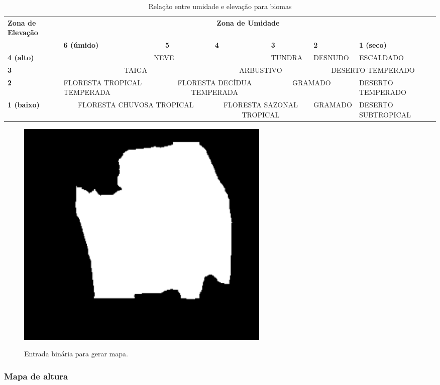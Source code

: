 \begin{table}
	\centering
	\caption{Relação entre umidade e elevação para biomas}
	\label{tab:biomes}
	\begin{tabularx}{\textwidth}{|X|X|X|X|X|X|X|}
	\hline
	\textbf{Zona de Elevação} & \multicolumn{6}{c|}{\textbf{Zona de Umidade}} \\
	\cline{2-7}
	 & \textbf{6 (úmido)} & \textbf{5} & \textbf{4} & \textbf{3} & \textbf{2} & \textbf{1 (seco)} \\
	\hline
	\textbf{4 (alto)} & \multicolumn{3}{|c|}{NEVE} & TUNDRA & DESNUDO & ESCALDADO  \\
	\hline
	\textbf{3} & \multicolumn{2}{|c|}{TAIGA} & \multicolumn{2}{|c|}{ARBUSTIVO} & \multicolumn{2}{|c|}{DESERTO TEMPERADO} \\
	\hline
	\textbf{2} & FLORESTA TROPICAL TEMPERADA & \multicolumn{2}{|c|}{FLORESTA DECÍDUA TEMPERADA} & \multicolumn{2}{|c|}{GRAMADO} & DESERTO TEMPERADO  \\
	\hline
	\textbf{1 (baixo)} &  \multicolumn{2}{|c|}{FLORESTA CHUVOSA TROPICAL} & \multicolumn{2}{|c|}{FLORESTA SAZONAL TROPICAL} & GRAMADO & DESERTO SUBTROPICAL  \\
	\hline
	\end{tabularx}
\end{table}

\begin{figure}[!ht]
	\centering
    \caption{Entrada binária para gerar mapa.}
	\includegraphics[width=0.6\textwidth]{figures/entrada_gerar_mapa.png}
	\label{fig:entrada_gerar_mapa}
\end{figure}

\subsubsection{Mapa de altura}


